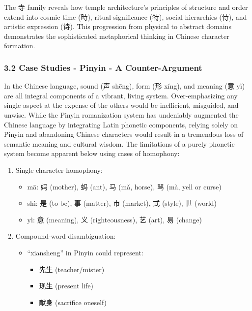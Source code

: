 \documentclass[
  11pt,
  letterpaper,
]{article}
\providecommand{\tightlist}{%
  \setlength{\itemsep}{0pt}\setlength{\parskip}{0pt}}
\begin{document}
The 寺 family reveals how temple architecture's principles of structure
and order extend into cosmic time (時), ritual significance (特), social
hierarchies (侍), and artistic expression (诗). This progression from
physical to abstract domains demonstrates the sophisticated metaphorical
thinking in Chinese character formation.

\subsubsection{3.2 Case Studies - Pinyin - A
Counter-Argument}\label{case-studies---pinyin---a-counter-argument}

In the Chinese language, sound (声 shēng), form (形 xíng), and meaning
(意 yì) are all integral components of a vibrant, living system.
Over-emphasizing any single aspect at the expense of the others would be
inefficient, misguided, and unwise. While the Pinyin romanization system
has undeniably augmented the Chinese language by integrating Latin
phonetic components, relying solely on Pinyin and abandoning Chinese
characters would result in a tremendous loss of semantic meaning and
cultural wisdom. The limitations of a purely phonetic system become
apparent below using cases of homophony:

\begin{enumerate}
\def\labelenumi{\arabic{enumi}.}
\tightlist
\item
  Single-character homophony:

  \begin{itemize}
  \tightlist
  \item
    mā: 妈 (mother), 蚂 (ant), 马 (mǎ, horse), 骂 (mà, yell or curse)
  \item
    shì: 是 (to be), 事 (matter), 市 (market), 式 (style), 世 (world)
  \item
    yì: 意 (meaning), 义 (righteousness), 艺 (art), 易 (change)
  \end{itemize}
\item
  Compound-word disambiguation:

  \begin{itemize}
  \tightlist
  \item
    ``xiansheng'' in Pinyin could represent:

    \begin{itemize}
    \tightlist
    \item
      先生 (teacher/mister)
    \item
      现生 (present life)
    \item
      献身 (sacrifice oneself)
    \end{itemize}
  \end{itemize}
\end{enumerate}
\end{document}
